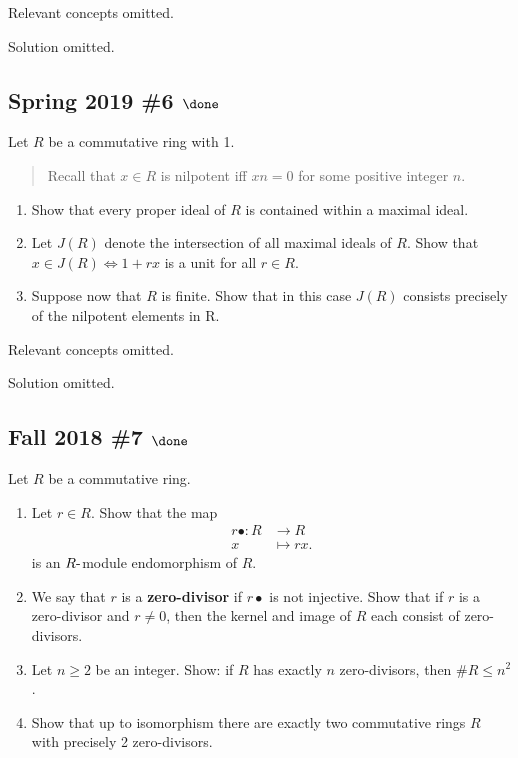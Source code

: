 Relevant concepts omitted.

Solution omitted.

\hypertarget{spring-2019-6-done}{%
\subsection{\texorpdfstring{Spring 2019 \#6
\(\done\)}{Spring 2019 \#6 \textbackslash done}}\label{spring-2019-6-done}}

Let \(R\) be a commutative ring with 1.

\begin{quote}
Recall that \(x \in R\) is nilpotent iff \(xn = 0\) for some positive
integer \(n\).
\end{quote}

\begin{enumerate}
\def\labelenumi{\alph{enumi}.}
\item
  Show that every proper ideal of \(R\) is contained within a maximal
  ideal.
\item
  Let \(J(R)\) denote the intersection of all maximal ideals of \(R\).
  Show that \(x \in J(R) \iff 1 + rx\) is a unit for all \(r \in R\).
\item
  Suppose now that \(R\) is finite. Show that in this case \(J(R)\)
  consists precisely of the nilpotent elements in R.
\end{enumerate}

Relevant concepts omitted.

Solution omitted.

\hypertarget{fall-2018-7-done}{%
\subsection{\texorpdfstring{Fall 2018 \#7
\(\done\)}{Fall 2018 \#7 \textbackslash done}}\label{fall-2018-7-done}}

Let \(R\) be a commutative ring.

\begin{enumerate}
\def\labelenumi{\alph{enumi}.}
\item
  Let \(r \in R\). Show that the map
  \begin{align*}
  r\bullet : R &\to R \\
  x &\mapsto r x
  .\end{align*}
  is an \(R{\hbox{-}}\)module endomorphism of \(R\).
\item
  We say that \(r\) is a \textbf{zero-divisor} if \(r\bullet\) is not
  injective. Show that if \(r\) is a zero-divisor and \(r \neq 0\), then
  the kernel and image of \(R\) each consist of zero-divisors.
\item
  Let \(n \geq 2\) be an integer. Show: if \(R\) has exactly \(n\)
  zero-divisors, then \(\#R \leq n^2\) .
\item
  Show that up to isomorphism there are exactly two commutative rings
  \(R\) with precisely 2 zero-divisors.
\end{enumerate}

